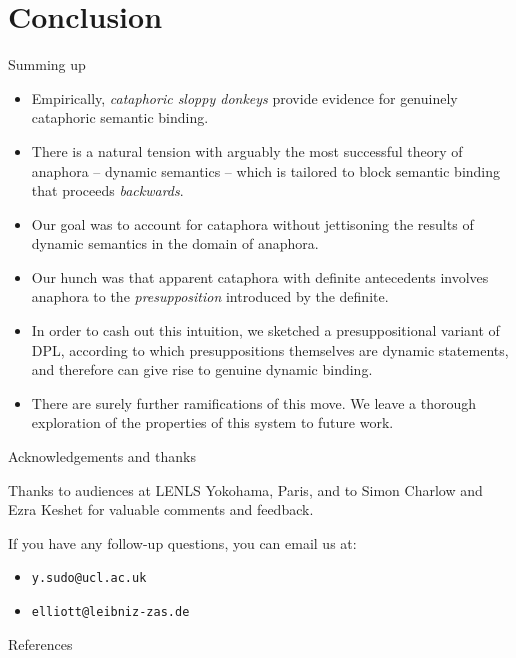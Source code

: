 \documentclass{beamer}
\begin{document}
\section{Conclusion}

\begin{frame}[allowframebreaks]{Summing up}

  \begin{itemize}

      \item Empirically, \textit{cataphoric sloppy donkeys} provide evidence for genuinely cataphoric semantic binding.

      \item There is a natural tension with arguably the most successful theory of anaphora -- dynamic semantics -- which is tailored to block semantic binding that proceeds \textit{backwards}.

      \item Our goal was to account for cataphora without jettisoning the results of dynamic semantics in the domain of anaphora.

      \framebreak

    \item Our hunch was that apparent cataphora with definite antecedents involves anaphora to the \textit{presupposition} introduced by the definite.

    \item In order to cash out this intuition, we sketched a presuppositional variant of DPL, according to which presuppositions themselves are dynamic statements, and therefore can give rise to genuine dynamic binding.

    \item There are surely further ramifications of this move. We leave a thorough exploration of the properties of this system to future work.

  \end{itemize}

\end{frame}

\begin{frame}{Acknowledgements and thanks}

  Thanks to audiences at LENLS Yokohama, Paris, and to Simon Charlow and Ezra Keshet for valuable comments and feedback.

  If you have any follow-up questions, you can email us at:

  \begin{itemize}

      \item \texttt{\alert{y.sudo@ucl.ac.uk}}

      \item \texttt{\alert{elliott@leibniz-zas.de}}

  \end{itemize}

\end{frame}

\begin{frame}[allowframebreaks]{References}

 \printbibliography[heading=none]

\end{frame}
\end{document}
